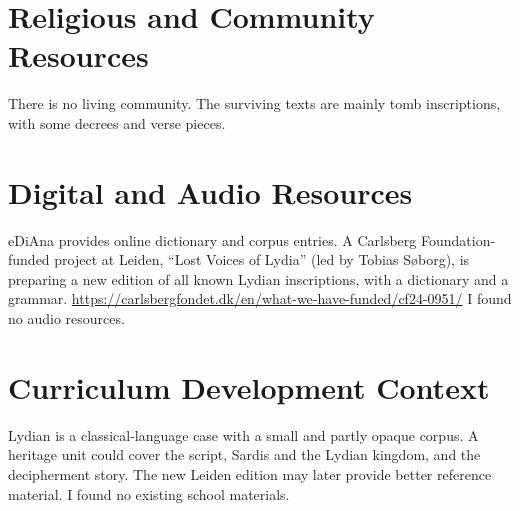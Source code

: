 \documentclass[12pt]{article}
\begin{document}
\section{Religious and Community Resources}
There is no living community. The surviving texts are mainly tomb inscriptions, with some decrees and verse pieces.

\section{Digital and Audio Resources}
eDiAna provides online dictionary and corpus entries. A Carlsberg Foundation-funded project at Leiden, ``Lost Voices of Lydia'' (led by Tobias Søborg), is preparing a new edition of all known Lydian inscriptions, with a dictionary and a grammar. \url{https://carlsbergfondet.dk/en/what-we-have-funded/cf24-0951/} I found no audio resources.

\section{Curriculum Development Context}
Lydian is a classical-language case with a small and partly opaque corpus. A heritage unit could cover the script, Sardis and the Lydian kingdom, and the decipherment story. The new Leiden edition may later provide better reference material. I found no existing school materials.
\end{document}
